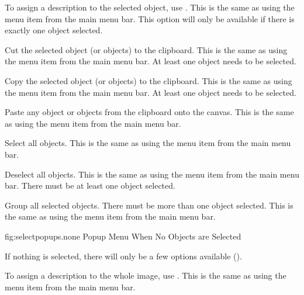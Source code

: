 
To assign a description to the selected \gls{object}, use
. This is the same as using the
 menu item from the main menu bar.
This option will only be available if there is exactly one
\gls{object} selected.


Cut the selected \gls{object} (or \glspl{object}) to the clipboard.
This is the same as using the  menu item from the
main menu bar. At least one \gls{object} needs to be selected.


Copy the selected \gls{object} (or \glspl{object}) to the clipboard.
This is the same as using the  menu item from the
main menu bar. At least one \gls{object} needs to be selected.


Paste any \gls{object} or \glspl{object} from the clipboard onto the
\gls{canvas}.
This is the same as using the  menu item from the
main menu bar.


Select all \glspl{object}.
This is the same as using the  menu item from the
main menu bar.


Deselect all \glspl{object}.
This is the same as using the  menu item from the
main menu bar. There must be at least one \gls{object} selected.


Group all selected \glspl{object}. There must be more than one
object selected.
This is the same as using the  menu item from the
main menu bar.



\FloatFig
  {fig:selectpopups.none}
  {}
  {Popup Menu When No Objects are Selected}

If nothing is selected, there will only be a few options available
().


To assign a description to the whole image, use
. This is the same as using the
 menu item from the main menu bar.

